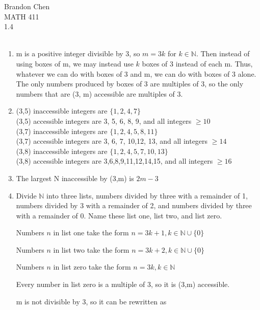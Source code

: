 \documentclass[11pt]{article}
\begin{document}
Brandon Chen \\
MATH 411\\

1.4\\
\\

\begin{enumerate}


\item m is a positive integer divisible by 3, so $m = 3k$ for $k\in\mathbb{N}$. Then instead of using boxes of m, we may instead use $k$ boxes of 3 instead of each m. Thus, whatever we can do with boxes of 3 and m, we can do with boxes of 3 alone. 
The only numbers produced by boxes of 3 are multiples of 3, so the only numbers that are (3, m) accessible are multiples of 3.

\item %
(3,5) inaccessible integers are $\{1,2,4,7\}$\\
(3,5) accessible integers are 3, 5, 6, 8, 9, and all integers $\geq 10$\\

(3,7) inaccessible integers are $\{1,2,4,5,8,11\}$\\
(3,7) accessible integers are 3, 6, 7, 10,12, 13, and all integers $\geq 14$\\

(3,8) inaccessible integers are $\{1,2,4,5,7,10,13\}$\\
(3,8) accessible integers are 3,6,8,9,11,12,14,15, and all integers $\geq 16$\\


\item %
The largest N inaccessible by (3,m) is $2m-3$

\item %
Divide $\mathbb{N}$ into three lists, numbers divided by three with a remainder of 1, numbers divided by 3 with a remainder of 2, and numbers divided by three with a remainder of 0. Name these list one, list two, and list zero.

Numbers $n$ in list one take the form $n = 3k + 1, k\in\mathbb{N} \cup \{0\}$

Numbers $n$ in list two take the form $n = 3k + 2, k\in\mathbb{N} \cup \{0\}$

Numbers $n$ in list zero take the form $n = 3k, k\in\mathbb{N}$

Every number in list zero is a multiple of 3, so it is (3,m) accessible.

m is not divisible by 3, so it can be rewritten as 


\end{enumerate}
\end{document}
